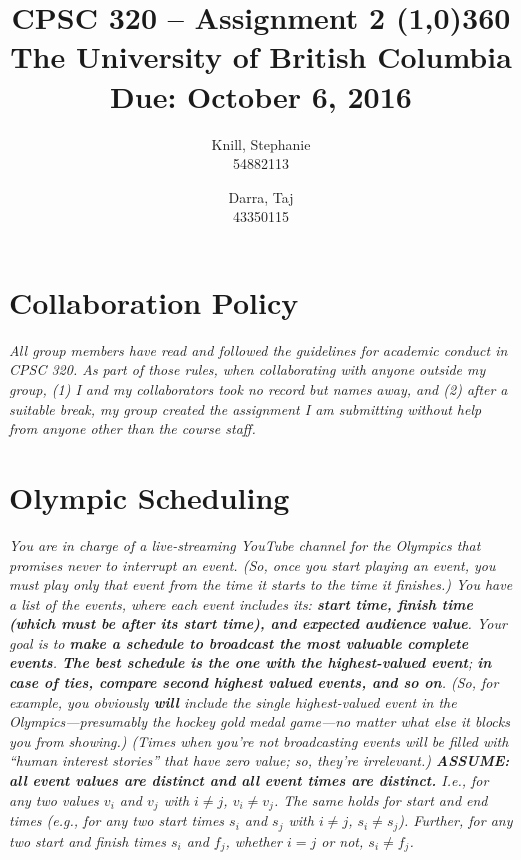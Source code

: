 \documentclass[11pt, oneside]{article}   	%
\theoremstyle{definition}
\theoremstyle{remark}
\begin{document}
\title{CPSC 320 -- Assignment 2
\line(1,0){360} \\               %
\vspace{0.5cm}
\large
The University of British Columbia \\
Due: October 6, 2016
\vspace{1cm}}
\author{
Knill, Stephanie\\
54882113
\and
Darra, Taj \\
43350115
}
\date{}                    %
\maketitle
\thispagestyle{empty}    %

\medskip 
\section*{Collaboration Policy}
\emph{All group members have read and followed the guidelines for academic conduct in CPSC 320. As part of those rules, when collaborating with anyone outside my group, (1) I and my collaborators took no record but names away, and (2) after a suitable break, my group created the assignment I am submitting without help from anyone other than the course staff.}

\cleardoublepage
\section{Olympic Scheduling}
\textit{You are in charge of a live-streaming YouTube channel for the Olympics that promises never to interrupt an event. (So, once you start playing an event, you must play only that event from the time it starts to the time it finishes.) You have a list of the events, where each event includes its: \textbf{start time, finish time (which must be after its start time), and expected audience value}. Your goal is to \textbf{make a schedule to broadcast the most valuable complete events}. \textbf{The best schedule is the one with the highest-valued event}; \textbf{in case of ties, compare second highest valued events, and so on}. (So, for example, you obviously \textbf{will} include the single highest-valued event in the Olympics---presumably the hockey gold medal game---no matter what else it blocks you from showing.) (Times when you're not broadcasting events will be filled with ``human interest stories'' that have zero value; so, they're irrelevant.) \textbf{ASSUME: all event values are distinct and all event times are distinct.} I.e., for any two values $v_i$ and $v_j$ with $i \neq j$, $v_i \neq v_j$. The same holds for start and end times (e.g., for any two start times $s_i$ and $s_j$ with $i \neq j$, $s_i \neq s_j$). Further, for any two start and finish times $s_i$ and $f_j$,
whether $i = j$ or not, $s_i \neq f_j$.}
\end{document}
